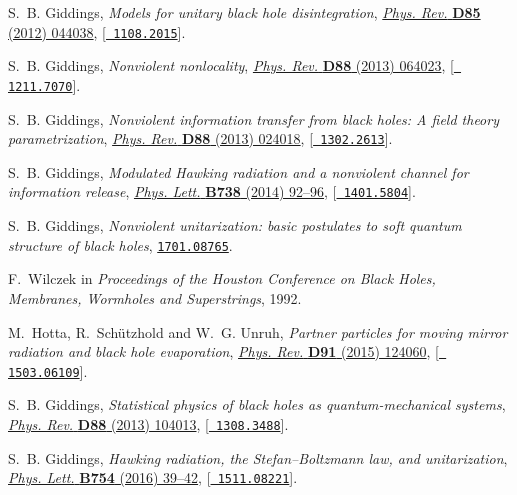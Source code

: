\documentclass[10pt]{article}
\begin{document}
\begin{thebibliography}{100}
S.~B. Giddings, \emph{{Models for unitary black hole disintegration}},
  \href{http://dx.doi.org/10.1103/PhysRevD.85.044038}{\emph{Phys. Rev.} {\bf
  D85} (2012) 044038}, [\href{http://arxiv.org/abs/1108.2015}{{\tt
  1108.2015}}].

S.~B. Giddings, \emph{{Nonviolent nonlocality}},
  \href{http://dx.doi.org/10.1103/PhysRevD.88.064023}{\emph{Phys. Rev.} {\bf
  D88} (2013) 064023}, [\href{http://arxiv.org/abs/1211.7070}{{\tt
  1211.7070}}].

S.~B. Giddings, \emph{{Nonviolent information transfer from black holes: A
  field theory parametrization}},
  \href{http://dx.doi.org/10.1103/PhysRevD.88.024018}{\emph{Phys. Rev.} {\bf
  D88} (2013) 024018}, [\href{http://arxiv.org/abs/1302.2613}{{\tt
  1302.2613}}].

S.~B. Giddings, \emph{{Modulated Hawking radiation and a nonviolent channel for
  information release}},
  \href{http://dx.doi.org/10.1016/j.physletb.2014.08.070}{\emph{Phys. Lett.}
  {\bf B738} (2014) 92--96}, [\href{http://arxiv.org/abs/1401.5804}{{\tt
  1401.5804}}].

S.~B. Giddings, \emph{{Nonviolent unitarization: basic postulates to soft
  quantum structure of black holes}},
  \href{http://arxiv.org/abs/1701.08765}{{\tt 1701.08765}}.

F.~Wilczek in \emph{{Proceedings of the Houston Conference on Black Holes,
  Membranes, Wormholes and Superstrings}}, 1992.

M.~Hotta, R.~Schützhold and W.~G. Unruh, \emph{{Partner particles for moving
  mirror radiation and black hole evaporation}},
  \href{http://dx.doi.org/10.1103/PhysRevD.91.124060}{\emph{Phys. Rev.} {\bf
  D91} (2015) 124060}, [\href{http://arxiv.org/abs/1503.06109}{{\tt
  1503.06109}}].

S.~B. Giddings, \emph{{Statistical physics of black holes as quantum-mechanical
  systems}}, \href{http://dx.doi.org/10.1103/PhysRevD.88.104013}{\emph{Phys.
  Rev.} {\bf D88} (2013) 104013}, [\href{http://arxiv.org/abs/1308.3488}{{\tt
  1308.3488}}].

S.~B. Giddings, \emph{{Hawking radiation, the Stefan–Boltzmann law, and
  unitarization}},
  \href{http://dx.doi.org/10.1016/j.physletb.2015.12.076}{\emph{Phys. Lett.}
  {\bf B754} (2016) 39--42}, [\href{http://arxiv.org/abs/1511.08221}{{\tt
  1511.08221}}].


\end{thebibliography}
\end{document}
